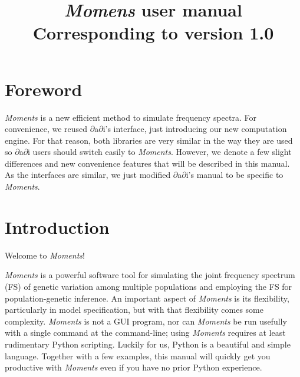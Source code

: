 \documentclass[12pt]{article}
\newcommand{\dadi}{$\partial$a$\partial$i\xspace}
\begin{document}
\title{\textit{Momens} user manual\\\normalsize  Corresponding to version 1.0}
\date{}
\maketitle

\tableofcontents

\clearpage

\renewcommand*{\lstlistlistingname}{Example code}
\lstlistoflistings

\clearpage
\setcounter{section}{-1}
\section{Foreword}
\textit{Moments} is a new efficient method to simulate frequency spectra. For convenience, we reused \dadi's interface, just introducing our new computation engine. For that reason, both libraries are very similar in the way they are used so \dadi users should switch easily to \textit{Moments}. However, we denote a few slight differences and new convenience features that will be described in this manual. As the interfaces are similar, we just modified \dadi's manual to be specific to \textit{Moments}.

\section{Introduction}

Welcome to \textit{Moments}!

\textit{Moments} is a powerful software tool for simulating the joint frequency spectrum (FS) of genetic variation among multiple populations and employing the FS for population-genetic inference.
An important aspect of \textit{Moments} is its flexibility, particularly in model specification, but with that flexibility comes some complexity.
\textit{Moments} is not a GUI program, nor can \textit{Moments} be run usefully with a single command at the command-line; using \textit{Moments} requires at least rudimentary Python scripting.
Luckily for us, Python is a beautiful and simple language.
Together with a few examples, this manual will quickly get you productive with \textit{Moments} even if you have no prior Python experience.

\end{document}
